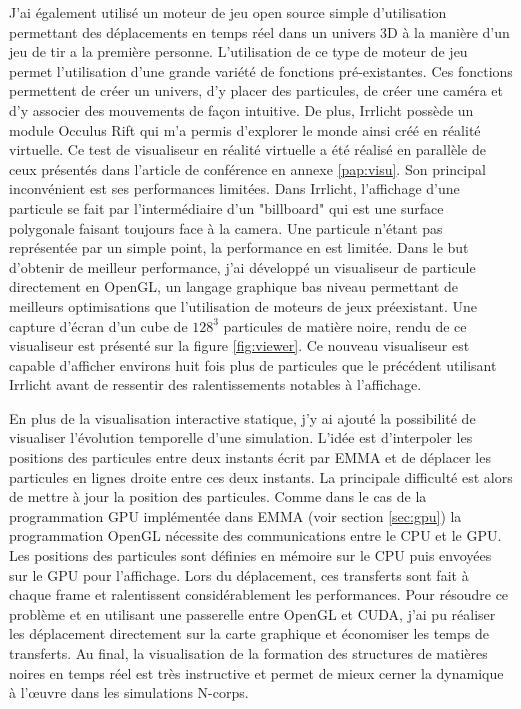 J'ai également utilisé \cite{Irrlicht} un moteur de jeu open source simple d'utilisation permettant des déplacements en temps réel dans un univers 3D à la manière d'un jeu de tir a la première personne.
L'utilisation de ce type de moteur de jeu permet l'utilisation d'une grande variété de fonctions pré-existantes.
Ces fonctions permettent de créer un univers, d'y placer des particules, de créer une caméra et d'y associer des mouvements de façon intuitive.
De plus, Irrlicht possède un module Occulus Rift qui m'a permis d'explorer le monde ainsi créé en réalité virtuelle.
Ce test de visualiseur en réalité virtuelle a été réalisé en parallèle de ceux présentés dans l'article de conférence en annexe \ref{pap:visu}.
Son principal inconvénient est ses performances limitées.
Dans Irrlicht, l'affichage d'une particule se fait par l'intermédiaire d'un "billboard" qui est une surface polygonale faisant toujours face à la camera.
Une particule n'étant pas représentée par un simple point, la performance en est limitée.
Dans le but d'obtenir de meilleur performance, j'ai développé un visualiseur de particule directement en OpenGL, un langage graphique bas niveau permettant de meilleurs optimisations que l'utilisation de moteurs de jeux préexistant.
Une capture d'écran d'un cube de $128^3$ particules de matière noire, rendu de ce visualiseur est présenté sur la figure \ref{fig:viewer}.
Ce nouveau visualiseur est capable d'afficher environs huit fois plus de particules que le précédent utilisant Irrlicht avant de ressentir des ralentissements notables à l'affichage. 


En plus de la visualisation interactive statique, j'y ai ajouté la possibilité de visualiser l’évolution temporelle d'une simulation.
L'idée est d'interpoler les positions des particules entre deux instants écrit par EMMA et de déplacer les particules en lignes droite entre ces deux instants.
La principale difficulté est alors de mettre à jour la position des particules.
Comme dans le cas de la programmation \ac{GPU} implémentée dans EMMA (voir section \ref{sec:gpu}) la programmation OpenGL nécessite des communications entre le \ac{CPU} et le \ac{GPU}.
Les positions des particules sont définies en mémoire sur le \ac{CPU} puis envoyées sur le \ac{GPU} pour l'affichage.
Lors du déplacement, ces transferts sont fait à chaque frame et ralentissent considérablement les performances.
Pour résoudre ce problème et en utilisant une passerelle entre OpenGL et CUDA, j'ai pu réaliser les déplacement directement sur la carte graphique et économiser les temps de transferts.
Au final, la visualisation de la formation des structures de matières noires en temps réel est très instructive et permet de mieux cerner la dynamique à l’œuvre dans les simulations N-corps.

